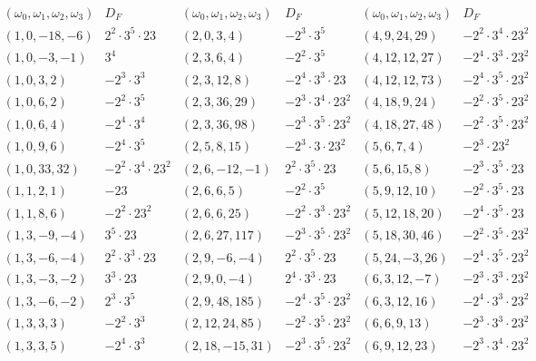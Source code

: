 \begin{landscape}
$$
\begin{array}{cc|cc|cc} 
(\omega_0,\omega_1,\omega_2,\omega_3) & D_F & (\omega_0,\omega_1,\omega_2,\omega_3)  & D_F & (\omega_0,\omega_1,\omega_2,\omega_3)  & D_F \\ \hline
(1,0,-18,-6) & 2^2 \cdot 3^5 \cdot 23 & (2, 0, 3, 4) & -2^3 \cdot 3^5  & (4, 9, 24, 29) & -2^2 \cdot 3^4 \cdot 23^2 \\
(1,0,-3,-1) & 3^4 &   (2, 3, 6, 4) & -2^2 \cdot 3^5  & (4,12,12,27) & -2^4 \cdot 3^3 \cdot 23^2 \\
(1,0,3,2) & -2^3 \cdot 3^3 & (2, 3, 12, 8) & -2^4 \cdot 3^3 \cdot 23 & (4,12,12,73) & -2^4 \cdot 3^5 \cdot 23^2 \\
(1,0,6,2) & -2^2 \cdot 3^5 & (2, 3, 36, 29) & -2^3 \cdot 3^4 \cdot 23^2  & (4, 18, 9, 24) & -2^2 \cdot 3^5 \cdot 23^2  \\
(1,0,6,4) & -2^4 \cdot 3^4 & (2, 3, 36, 98) & -2^3 \cdot 3^5 \cdot 23^2  & (4, 18, 27, 48) & -2^2 \cdot 3^5 \cdot 23^2 \\
(1,0,9,6) & -2^4 \cdot 3^5 & (2, 5, 8, 15) & -2^3 \cdot 3 \cdot 23^2  & (5, 6, 7, 4) & -2^3 \cdot  23^2 \\
(1,0,33,32) & -2^2 \cdot 3^4 \cdot 23^2 & (2, 6, -12, -1) & 2^2 \cdot 3^5 \cdot 23 & (5, 6, 15, 8) & -2^3 \cdot 3^5 \cdot 23 \\
(1,1,2,1) & -23 & (2, 6, 6, 5) & -2^2 \cdot 3^5  & (5, 9, 12, 10) & -2^2 \cdot 3^5 \cdot 23 \\
(1,1,8,6) & -2^2 \cdot 23^2 & (2, 6, 6, 25) & -2^2 \cdot 3^3 \cdot 23^2  & (5, 12, 18, 20) & -2^4 \cdot 3^5 \cdot 23 \\
(1, 3, -9, -4) & 3^5 \cdot 23 & (2, 6, 27, 117) & -2^3 \cdot 3^5 \cdot 23^2 & (5, 18, 30, 46) & -2^2 \cdot 3^5 \cdot 23^2 \\
(1,3,-6,-4) & 2^2 \cdot 3^3 \cdot 23 & (2, 9, -6, -4) & 2^2 \cdot 3^5 \cdot 23 & (5,24,-3,26) & -2^4 \cdot 3^5 \cdot 23^2  \\
(1,3,-3,-2) & 3^3\cdot 23 & (2, 9, 0, -4) & 2^4 \cdot 3^3 \cdot 23 & (6, 3, 12, -7) & -2^3 \cdot 3^3 \cdot 23^2 \\
(1,3,-6,-2) & 2^3 \cdot 3^5 & (2,9,48,185) & -2^4 \cdot 3^5 \cdot 23^2 & (6, 3, 12, 16) & -2^4 \cdot 3^3 \cdot 23^2 \\
(1,3,3,3) & -2^2 \cdot 3^3 & (2, 12, 24, 85) & -2^2 \cdot 3^5 \cdot 23^2 & (6, 6, 9, 13) & -2^3 \cdot 3^3 \cdot 23^2 \\
(1,3,3,5) & -2^4 \cdot 3^3 & (2, 18, -15, 31) & -2^3 \cdot 3^5 \cdot 23^2 & (6, 9, 12, 23) & -2^3 \cdot 3^4 \cdot 23^2 

\end{array}$$
\end{landscape}
